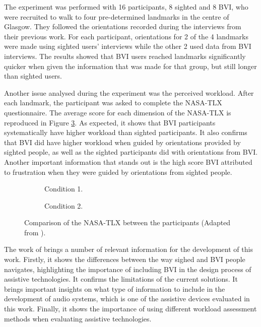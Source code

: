 The experiment was performed with 16 participants, 8 sighted and 8 BVI, who were recruited to walk to four pre-determined landmarks in the centre of Glasgow. They followed the orientations recorded during the interviews from their previous work. For each participant, orientations for 2 of the 4 landmarks were made using sighted users’ interviews while the other 2 used data from BVI interviews. The results showed that BVI users reached landmarks significantly quicker when given the information that was made for that group, but still longer than sighted users. 

Another issue analysed during the experiment was the perceived workload. After each landmark, the participant was asked to complete the NASA-TLX questionnaire. The average score for each dimension of the NASA-TLX is reproduced in Figure \ref{fig:bradley_2005_participants}. As expected, it shows that BVI participants systematically have higher workload than sighted participants. It also confirms that BVI did have higher workload when guided by orientations provided by sighted people, as well as the sighted participants did with orientations from BVI. Another important information that stands out is the high score BVI attributed to frustration when they were guided by orientations from sighted people. 


\begin{figure}[htbp]
    \centering
    \begin{subfigure}{.49\textwidth}
        \centering
        \resizebox{\linewidth}{!}{
        
        }
        \caption{Condition 1.}
        \label{fig:bradley_2005_nasa_participants_1}
    \end{subfigure}
    \hfill
    \begin{subfigure}{.49\textwidth}
        \centering
        \resizebox{\linewidth}{!}{
        
        }
        \caption{Condition 2.}
        \label{fig:bradley_2005_nasa_participants_2}
    \end{subfigure}
\caption{Comparison of the NASA-TLX between the participants (Adapted from ).}
\label{fig:bradley_2005_participants}
\end{figure}

The work of  brings a number of relevant information for the development of this work. Firstly, it shows the differences between the way sighed and BVI people navigates, highlighting the importance of including BVI in the design process of assistive technologies. It confirms the limitations of the current solutions. It brings important insights on what type of information to include in the development of audio systems, which is one of the assistive devices evaluated in this work. Finally, it shows the importance of using different workload assessment methods when evaluating assistive technologies.
